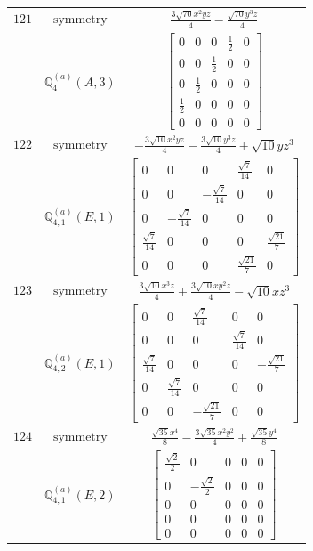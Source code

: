 \documentclass[fleqn,8pt,landscape]{jsarticle}
\begin{document}
\begin{longtable}{ccc}
$ 121 $ & $ \text{symmetry} $ & $ \frac{3 \sqrt{70} x^{2} y z}{4} - \frac{\sqrt{70} y^{3} z}{4} $ \\
$  $ & $ \mathbb{Q}_{4}^{(a)}(A,3) $ & $ \begin{bmatrix} 0 & 0 & 0 & \frac{1}{2} & 0 \\ 0 & 0 & \frac{1}{2} & 0 & 0 \\ 0 & \frac{1}{2} & 0 & 0 & 0 \\ \frac{1}{2} & 0 & 0 & 0 & 0 \\ 0 & 0 & 0 & 0 & 0 \end{bmatrix} $ \\ \hline
$ 122 $ & $ \text{symmetry} $ & $ - \frac{3 \sqrt{10} x^{2} y z}{4} - \frac{3 \sqrt{10} y^{3} z}{4} + \sqrt{10} y z^{3} $ \\
$  $ & $ \mathbb{Q}_{4,1}^{(a)}(E,1) $ & $ \begin{bmatrix} 0 & 0 & 0 & \frac{\sqrt{7}}{14} & 0 \\ 0 & 0 & - \frac{\sqrt{7}}{14} & 0 & 0 \\ 0 & - \frac{\sqrt{7}}{14} & 0 & 0 & 0 \\ \frac{\sqrt{7}}{14} & 0 & 0 & 0 & \frac{\sqrt{21}}{7} \\ 0 & 0 & 0 & \frac{\sqrt{21}}{7} & 0 \end{bmatrix} $ \\ \hline
$ 123 $ & $ \text{symmetry} $ & $ \frac{3 \sqrt{10} x^{3} z}{4} + \frac{3 \sqrt{10} x y^{2} z}{4} - \sqrt{10} x z^{3} $ \\
$  $ & $ \mathbb{Q}_{4,2}^{(a)}(E,1) $ & $ \begin{bmatrix} 0 & 0 & \frac{\sqrt{7}}{14} & 0 & 0 \\ 0 & 0 & 0 & \frac{\sqrt{7}}{14} & 0 \\ \frac{\sqrt{7}}{14} & 0 & 0 & 0 & - \frac{\sqrt{21}}{7} \\ 0 & \frac{\sqrt{7}}{14} & 0 & 0 & 0 \\ 0 & 0 & - \frac{\sqrt{21}}{7} & 0 & 0 \end{bmatrix} $ \\ \hline
$ 124 $ & $ \text{symmetry} $ & $ \frac{\sqrt{35} x^{4}}{8} - \frac{3 \sqrt{35} x^{2} y^{2}}{4} + \frac{\sqrt{35} y^{4}}{8} $ \\
$  $ & $ \mathbb{Q}_{4,1}^{(a)}(E,2) $ & $ \begin{bmatrix} \frac{\sqrt{2}}{2} & 0 & 0 & 0 & 0 \\ 0 & - \frac{\sqrt{2}}{2} & 0 & 0 & 0 \\ 0 & 0 & 0 & 0 & 0 \\ 0 & 0 & 0 & 0 & 0 \\ 0 & 0 & 0 & 0 & 0 \end{bmatrix} $ \\ \hline

\end{longtable}
\end{document}
